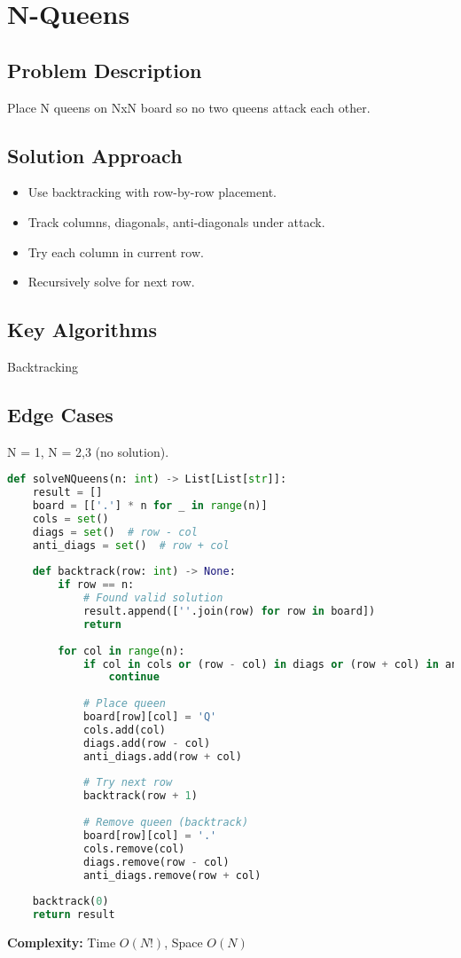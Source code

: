 \documentclass[10pt, a4paper]{article}
\begin{document}
\section{N-Queens}
\subsection*{Problem Description}
Place N queens on NxN board so no two queens attack each other.

\subsection*{Solution Approach}
\begin{itemize}
    \item Use backtracking with row-by-row placement.
    \item Track columns, diagonals, anti-diagonals under attack.
    \item Try each column in current row.
    \item Recursively solve for next row.
\end{itemize}

\subsection*{Key Algorithms}
Backtracking

\subsection*{Edge Cases}
N = 1, N = 2,3 (no solution).

\begin{lstlisting}[language=Python]
def solveNQueens(n: int) -> List[List[str]]:
    result = []
    board = [['.'] * n for _ in range(n)]
    cols = set()
    diags = set()  # row - col
    anti_diags = set()  # row + col
    
    def backtrack(row: int) -> None:
        if row == n:
            # Found valid solution
            result.append([''.join(row) for row in board])
            return
        
        for col in range(n):
            if col in cols or (row - col) in diags or (row + col) in anti_diags:
                continue
            
            # Place queen
            board[row][col] = 'Q'
            cols.add(col)
            diags.add(row - col)
            anti_diags.add(row + col)
            
            # Try next row
            backtrack(row + 1)
            
            # Remove queen (backtrack)
            board[row][col] = '.'
            cols.remove(col)
            diags.remove(row - col)
            anti_diags.remove(row + col)
    
    backtrack(0)
    return result
\end{lstlisting}
\textbf{Complexity:} Time $O(N!)$, Space $O(N)$
\end{document}
